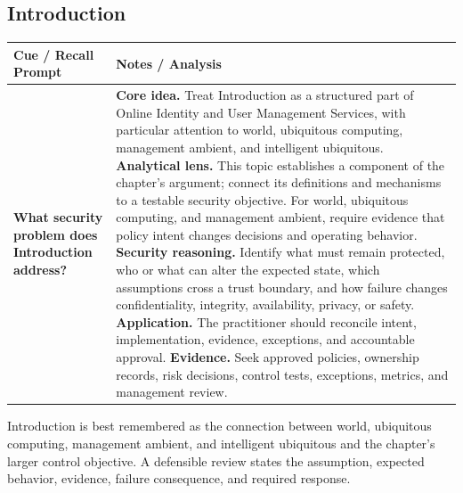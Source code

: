 \documentclass[11pt]{article}
\newcommand{\CornellHeader}{%
\rowcolor{Navy}\color{white}\bfseries Cue / Recall Prompt & \color{white}\bfseries Notes / Analysis\\\hline}
\newcommand{\CornellRow}[2]{%
\cellcolor{CueGray}\RaggedRight\textbf{#1} & \RaggedRight #2\\\hline}
\begin{document}
\subsection*{Introduction}
\begin{longtable}{>{\RaggedRight\arraybackslash}p{}|>{\RaggedRight\arraybackslash}p{}}
\CornellHeader
\CornellRow{What security problem does Introduction address?}{\textbf{Core idea.} Treat Introduction as a structured part of Online Identity and User Management Services, with particular attention to world, ubiquitous computing, management ambient, and intelligent ubiquitous. \textbf{Analytical lens.} This topic establishes a component of the chapter's argument; connect its definitions and mechanisms to a testable security objective. For world, ubiquitous computing, and management ambient, require evidence that policy intent changes decisions and operating behavior. \textbf{Security reasoning.} Identify what must remain protected, who or what can alter the expected state, which assumptions cross a trust boundary, and how failure changes confidentiality, integrity, availability, privacy, or safety. \textbf{Application.} The practitioner should reconcile intent, implementation, evidence, exceptions, and accountable approval. \textbf{Evidence.} Seek approved policies, ownership records, risk decisions, control tests, exceptions, metrics, and management review.}
\end{longtable}
\begin{topicsummary}
Introduction is best remembered as the connection between world, ubiquitous computing, management ambient, and intelligent ubiquitous and the chapter's larger control objective. A defensible review states the assumption, expected behavior, evidence, failure consequence, and required response.
\end{topicsummary}
\end{document}
